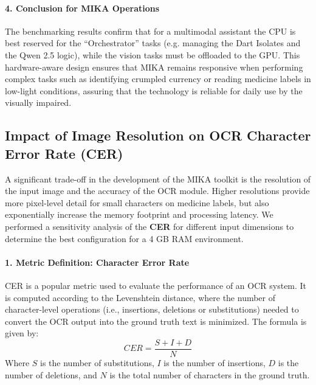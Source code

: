 \documentclass[12pt,a4paper]{report}
\begin{document}
\paragraph{4. Conclusion for MIKA Operations}
The benchmarking results confirm that for a multimodal assistant the CPU is best reserved for the “Orchestrator” tasks (e.g. managing the Dart Isolates and the Qwen 2.5 logic), while the vision tasks must be offloaded to the GPU. This hardware-aware design ensures that MIKA remains responsive when performing complex tasks such as identifying crumpled currency or reading medicine labels in low-light conditions, assuring that the technology is reliable for daily use by the visually impaired.

\subsection{Impact of Image Resolution on OCR Character Error Rate (CER)}
 
A significant trade-off in the development of the MIKA toolkit is the resolution of the input image and the accuracy of the OCR module. Higher resolutions provide more pixel-level detail for small characters on medicine labels, but also exponentially increase the memory footprint and processing latency. We performed a sensitivity analysis of the \textbf{CER} for different input dimensions to determine the best configuration for a 4 GB RAM environment.
 
\paragraph{1. Metric Definition: Character Error Rate}
CER is a popular metric used to evaluate the performance of an OCR system. It is computed according to the Levenshtein distance, where the number of character-level operations (i.e., insertions, deletions or substitutions) needed to convert the OCR output into the ground truth text is minimized.
The formula is given by:
\begin{equation}
CER = \frac{S + I + D}{N}
\end{equation}
Where $S$ is the number of substitutions, $I$ is the number of insertions, $D$ is the number of deletions, and $N$ is the total number of characters in the ground truth.
 
\end{document}
